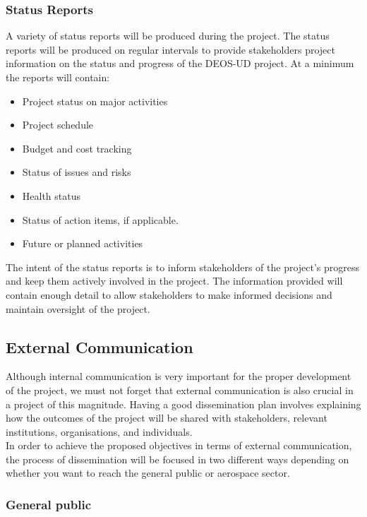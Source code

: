 \subsubsection{Status Reports}

A variety of status reports will be produced during the project. The status reports will be produced on regular intervals to provide stakeholders project information on the status and progress of the DEOS-UD project. At a minimum the reports will contain:
 \begin{itemize}
	\item Project status on major activities
	\item Project schedule
	\item Budget and cost tracking
	\item Status of issues and risks
	\item Health status	
	\item Status of action items, if applicable.
	\item Future or planned activities 
 \end{itemize}

The intent of the status reports is to inform stakeholders of the project’s progress and keep them actively involved in the project. The information provided will contain enough detail to allow stakeholders to make informed decisions and maintain oversight of the project.

\subsection{External Communication}

Although internal communication is very important for the proper development of the project, we must not forget that external communication is also crucial in a project of this magnitude. Having a good dissemination plan involves explaining how the outcomes of the project will be shared with stakeholders, relevant institutions, organisations, and individuals. \\
In order to achieve the proposed objectives in terms of external communication, the process of dissemination will be focused  in two different ways depending on whether you want to reach the general public or aerospace sector.

\subsubsection{General public}


